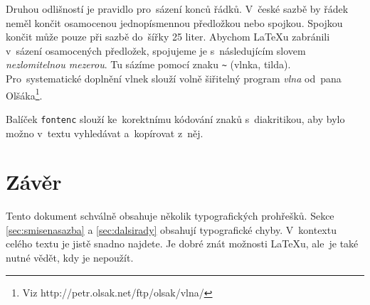 \documentclass[10pt,a4paper,twocolumn]{article}
\begin{document}
Druhou odlišností je pravidlo pro~sázení konců řádků. V~české sazbě by řádek neměl končit osamocenou jednopísmennou předložkou nebo spojkou. Spojkou ~ končit může pouze při sazbě do~šířky 25 liter. Abychom \LaTeX u zabránili v~sázení osamocených předložek, spojujeme je s~následujícím slovem \emph{nezlomitelnou mezerou}. Tu sázíme pomocí znaku \verb!~! (vlnka, tilda). Pro~systematické doplnění vlnek slouží volně šiřitelný program \emph{vlna} od~pana Olšáka\footnote{Viz http://petr.olsak.net/ftp/olsak/vlna/}.

Balíček \texttt{fontenc} slouží ke~korektnímu kódování znaků s~diakritikou, aby bylo možno v~textu vyhledávat a~kopírovat z~něj.

\section{Závěr}

Tento dokument schválně obsahuje několik typografických prohřešků. Sekce \ref{sec:smisenasazba} a \ref{sec:dalsirady} obsahují typografické chyby. V~kontextu celého textu je jistě snadno najdete. Je dobré znát možnosti \LaTeX u, ale~je také nutné vědět, kdy je nepoužít.
\end{document}
